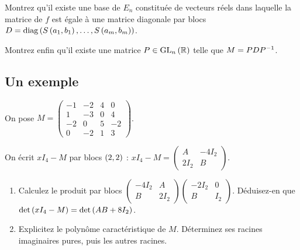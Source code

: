 \begin{corr}
\end{corr}

\begin{q}
Montrez qu'il existe une base de \(E_n\) constituée de vecteurs réels dans laquelle la matrice de \(f\) est égale à une matrice diagonale par blocs \(D=\operatorname{diag}\left(S\left(a_1,b_1\right),\dots,S\left(a_m,b_m\right)\right)\).

Montrez enfin qu'il existe une matrice \(P\in\GL{n}[\R]\) telle que \(M=PDP^{-1}\).
\end{q}

\begin{corr}
\end{corr}

\subsection*{Un exemple}

On pose \(M=\begin{pmatrix}
-1 & -2 & 4 & 0 \\
1 & -3 & 0 & 4 \\
-2 & 0 & 5 & -2 \\
0 & -2 & 1 & 3
\end{pmatrix}\).

\begin{q}
On écrit \(xI_4-M\) par blocs \(\left(2,2\right)\) : \(xI_4-M=\begin{pmatrix}
A & -4I_2 \\
2I_2 & B
\end{pmatrix}\).

\begin{enumerate}
    \item Calculez le produit par blocs \(\begin{pmatrix}-4I_2 & A \\ B & 2I_2\end{pmatrix}\begin{pmatrix}-2I_2 & 0 \\ B & I_2\end{pmatrix}\). Déduisez-en que \(\det\left(xI_4-M\right)=\det\left(AB+8I_2\right)\). \\
    \item Explicitez le polynôme caractéristique de \(M\). Déterminez ses racines imaginaires pures, puis les autres racines.
\end{enumerate}
\end{q}

